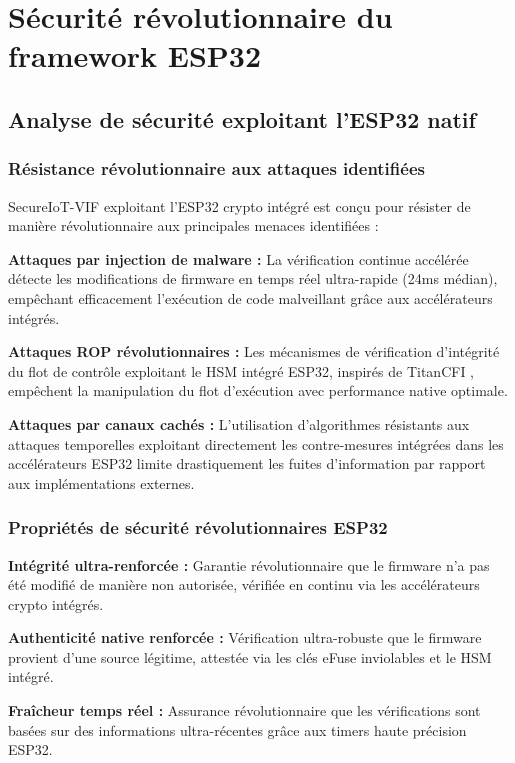\section{Sécurité révolutionnaire du framework ESP32}

\subsection{Analyse de sécurité exploitant l'ESP32 natif}

\subsubsection{Résistance révolutionnaire aux attaques identifiées}

SecureIoT-VIF exploitant l'ESP32 crypto intégré est conçu pour résister de manière révolutionnaire aux principales menaces identifiées :

\textbf{Attaques par injection de malware :} La vérification continue accélérée détecte les modifications de firmware en temps réel ultra-rapide (24ms médian), empêchant efficacement l'exécution de code malveillant grâce aux accélérateurs intégrés.

\textbf{Attaques ROP révolutionnaires :} Les mécanismes de vérification d'intégrité du flot de contrôle exploitant le HSM intégré ESP32, inspirés de TitanCFI \cite{Parisi2024TitanCFI}, empêchent la manipulation du flot d'exécution avec performance native optimale.

\textbf{Attaques par canaux cachés :} L'utilisation d'algorithmes résistants aux attaques temporelles exploitant directement les contre-mesures intégrées dans les accélérateurs ESP32 limite drastiquement les fuites d'information par rapport aux implémentations externes.

\subsubsection{Propriétés de sécurité révolutionnaires ESP32}

\textbf{Intégrité ultra-renforcée :} Garantie révolutionnaire que le firmware n'a pas été modifié de manière non autorisée, vérifiée en continu via les accélérateurs crypto intégrés.

\textbf{Authenticité native renforcée :} Vérification ultra-robuste que le firmware provient d'une source légitime, attestée via les clés eFuse inviolables et le HSM intégré.

\textbf{Fraîcheur temps réel :} Assurance révolutionnaire que les vérifications sont basées sur des informations ultra-récentes grâce aux timers haute précision ESP32.

